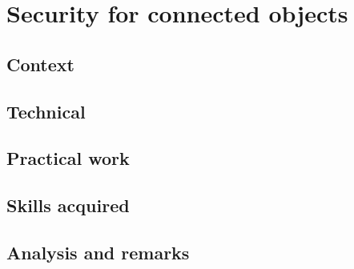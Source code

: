 \section{Security for connected objects}
\subsection{Context}
\subsection{Technical}
\subsection{Practical work}
\subsection{Skills acquired}
\subsection{Analysis and remarks}